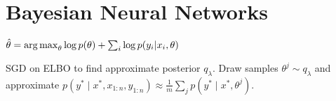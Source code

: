 \section{Bayesian Neural Networks}
$\hat{\theta} = \operatorname*{arg\,max}_\theta \log p(\theta) + \sum_{i} \log p(y_i | x_i, \theta)$

SGD on ELBO to find approximate posterior $q_\lambda$. Draw samples $\theta^{j} \sim q_\lambda$ and approximate
{$p(y^* \mid x^*, x_{1:n}, y_{1:n}) \approx \frac{1}{m} \sum_j p(y^* \mid x^*, \theta^{j})$.}


